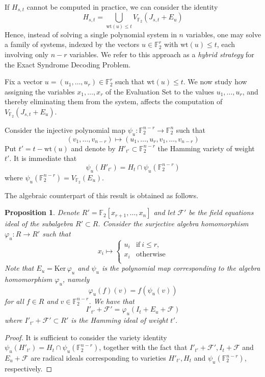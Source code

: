 \documentclass{amsart}
\newtheorem{proposition}[theorem]{Proposition}
\def\FF{{\mathbb F}}
\def\Ker{{\mathrm{Ker\,}}}
\def\wt{{\mathrm{wt}}}
\def\cF{{\mathcal{F}}}
\begin{document}
If $H_{s,t}$ cannot be computed in practice, we can consider the identity
\[
H_{s,t} = \bigcup_{\wt(u)\leq t} V_{\FF_2}(J_{s,t} + E_u)
\]
Hence, instead of solving a single polynomial system in $n$ variables, one may solve a family
of systems, indexed by the vectors $u\in\FF_2^r$ with $\wt(u)\leq t$, each involving only
$n-r$ variables. We refer to this approach as a {\em hybrid strategy} for the Exact Syndrome
Decoding Problem.

Fix a vector $u = (u_1,\ldots,u_r)\in\FF_2^r$ such that $\wt(u)\leq t$.
We now study how assigning the variables $x_1,\ldots,x_r$ of the Evaluation Set
to the values $u_1,\ldots,u_r$, and thereby eliminating them from the system, affects
the computation of $V_{\FF_2}(J_{s,t} + E_u)$.

Consider the injective polynomial map $\psi_u:\FF_2^{n-r} \to \FF_2^n$ such that
\[
(v_1,\ldots,v_{n-r})\mapsto (u_1,\ldots,u_r,v_1,\ldots,v_{n-r})
\]
Put $t' = t - \wt(u)$ and denote by $H'_{t'}\subset \FF_2^{n-r}$ the Hamming variety
of weight $t'$. It is immediate that
\[
\psi_u(H'_{t'}) = H_t \cap \psi_u(\FF_2^{n-r})
\]
where $\psi_u(\FF_2^{n-r}) = V_{\FF_2}(E_u)$.

The algebraic counterpart of this result is obtained as follows.

\begin{proposition}
Denote $R' = \FF_2[x_{r+1},\ldots,x_n]$ and let $\cF'$ be the field equations
ideal of the subalgebra $R'\subset R$. Consider the surjective algebra homomorphism
$\varphi_u:R\to R'$ such that
\[
x_i\mapsto
\left\{
\begin{array}{cl}
u_i & \mbox{if}\ i\leq r, \\
x_i & \mbox{otherwise} \\
\end{array}
\right.
\]
Note that $E_u = \Ker\varphi_u$ and $\psi_u$ is the polynomial map corresponding to
the algebra homomorphism $\varphi_u$, namely
\[
\varphi_u(f)(v) = f(\psi_u(v))
\]
for all $f\in R$ and $v\in\FF_2^{n-r}$. We have that
\[
I'_{t'} + \cF' = \varphi_u(I_t + E_u + \cF)
\]
where $I'_{t'} + \cF'\subset R'$ is the Hamming ideal of weight $t'$.
\end{proposition}

\begin{proof}
It is sufficient to consider the variety identity $\psi_u(H'_{t'}) = H_t \cap \psi_u(\FF_2^{n-r})$,
together with the fact that $I'_{t'} + \cF', I_t + \cF$ and $E_u + \cF$ are radical ideals
corresponding to varieties $H'_{t'}, H_t$ and $\psi_u(\FF_2^{n-r})$, respectively.
\end{proof}
\end{document}
